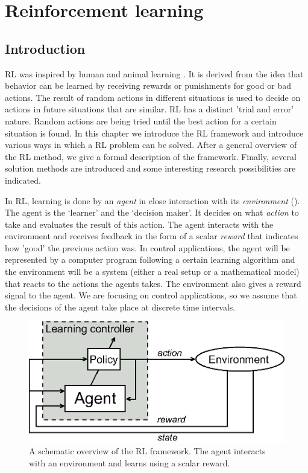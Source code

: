 \chapter{Reinforcement learning}\label{chap:Reinforcement Learning}

\section{Introduction}\label{sec:RL-introduction}
\ac{RL} was inspired by human and animal learning \cite{SuttonBarto:98}. It is derived from the idea that behavior can be learned by receiving rewards or punishments for good or bad actions. The result of random actions in different situations is used to decide on actions in future situations that are similar. \ac{RL} has a distinct 'trial and error' nature. Random actions are being tried until the best action for a certain situation is found. In this chapter we introduce the \ac{RL} framework and introduce various ways in which a \ac{RL} problem can be solved. After a general overview of the \ac{RL} method, we give a formal description of the framework. Finally, several solution methods are introduced and some interesting research possibilities are indicated.

In \ac{RL}, learning is done by an \emph{agent} in close interaction with its \emph{environment} (). The agent is the `learner' and the `decision maker'. It decides on what \emph{action} to take and evaluates the result of this action. The agent interacts with the environment and receives feedback in the form of a scalar \emph{reward} that indicates how 'good' the previous action was. In control applications, the agent will be represented by a computer program following a certain learning algorithm and the environment will be a system (either a real setup or a mathematical model) that reacts to the actions the agents takes. The environment also gives a reward signal to the agent. We are focusing on control applications, so we assume that the decisions of the agent take place at discrete time intervals. 
\begin{figure}[htbp]
	\centering
		\includegraphics[width=.5\textwidth]{img/RLoverview}
	\caption[Overview of the \acs{RL} framework]{A schematic overview of the \ac{RL} framework. The agent interacts with an environment and learns using a scalar reward.}
	\label{fig:RL-RLframework}
\end{figure}


